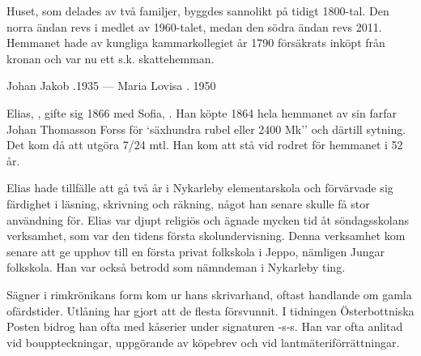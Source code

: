 Huset, som delades av två familjer, byggdes sannolikt på tidigt 1800-tal. Den norra ändan revs i medlet av 1960-talet, medan den södra ändan revs 2011. Hemmanet hade av kungliga kammarkollegiet år 1790 försäkrats inköpt från kronan och var nu ett s.k. skattehemman.

Johan Jakob .1935  ---  Maria Lovisa . 1950


%
Elias, , gifte sig 1866 med Sofia, . Han  köpte 1864 hela hemmanet  av sin farfar Johan Thomasson Forss för `säxhundra rubel eller 2400 Mk'' och därtill sytning. Det kom då att utgöra 7/24 mtl. Han kom att stå vid rodret för hemmanet  i 52 år.

Elias hade tillfälle att gå två år i Nykarleby elementarskola och förvärvade sig färdighet i läsning, skrivning och räkning, något han senare skulle få stor användning för. Elias var djupt religiös och ägnade mycken tid åt söndagsskolans verksamhet, som var den tidens första skolundervisning. Denna verksamhet kom senare att ge upphov till en första privat folkskola i Jeppo, nämligen Jungar folkskola. Han var också betrodd som nämndeman i Nykarleby ting.

Sägner i rimkrönikans form kom ur hans skrivarhand, oftast handlande om gamla ofärdstider. Utlåning har gjort att de flesta försvunnit. I tidningen Österbottniska Posten bidrog han ofta med kåserier under signaturen  -s-s. Han var ofta anlitad vid bouppteckningar, uppgörande av köpebrev och vid lantmäteriförrättningar.
\begin{jhchildren}
  \item {}
  \item {}
  \item {}
  \item {}
  \item {}
  \item {}
  \item {}
  \item {}
  \item {}
  \item {}
\end{jhchildren}

